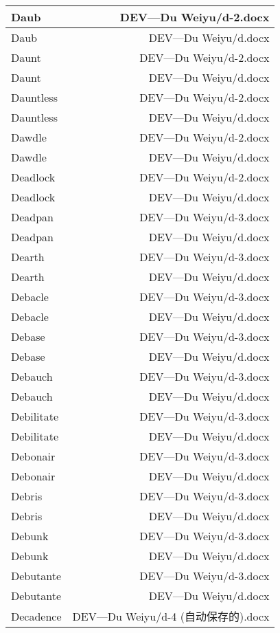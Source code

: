 \documentclass{article}
\begin{document}
\begin{center}
\begin{longtable}{|l|r|}
\hline
Daub  &  DEV---Du Weiyu/d-2.docx\\  
\hline
Daub  &  DEV---Du Weiyu/d.docx\\  
\hline
Daunt  &  DEV---Du Weiyu/d-2.docx\\  
\hline
Daunt  &  DEV---Du Weiyu/d.docx\\  
\hline
Dauntless  &  DEV---Du Weiyu/d-2.docx\\  
\hline
Dauntless  &  DEV---Du Weiyu/d.docx\\  
\hline
Dawdle  &  DEV---Du Weiyu/d-2.docx\\  
\hline
Dawdle  &  DEV---Du Weiyu/d.docx\\  
\hline
Deadlock  &  DEV---Du Weiyu/d-2.docx\\  
\hline
Deadlock  &  DEV---Du Weiyu/d.docx\\  
\hline
Deadpan  &  DEV---Du Weiyu/d-3.docx\\  
\hline
Deadpan  &  DEV---Du Weiyu/d.docx\\  
\hline
Dearth  &  DEV---Du Weiyu/d-3.docx\\  
\hline
Dearth  &  DEV---Du Weiyu/d.docx\\  
\hline
Debacle  &  DEV---Du Weiyu/d-3.docx\\  
\hline
Debacle  &  DEV---Du Weiyu/d.docx\\  
\hline
Debase  &  DEV---Du Weiyu/d-3.docx\\  
\hline
Debase  &  DEV---Du Weiyu/d.docx\\  
\hline
Debauch  &  DEV---Du Weiyu/d-3.docx\\  
\hline
Debauch  &  DEV---Du Weiyu/d.docx\\  
\hline
Debilitate  &  DEV---Du Weiyu/d-3.docx\\  
\hline
Debilitate  &  DEV---Du Weiyu/d.docx\\  
\hline
Debonair  &  DEV---Du Weiyu/d-3.docx\\  
\hline
Debonair  &  DEV---Du Weiyu/d.docx\\  
\hline
Debris  &  DEV---Du Weiyu/d-3.docx\\  
\hline
Debris  &  DEV---Du Weiyu/d.docx\\  
\hline
Debunk  &  DEV---Du Weiyu/d-3.docx\\  
\hline
Debunk  &  DEV---Du Weiyu/d.docx\\  
\hline
Debutante  &  DEV---Du Weiyu/d-3.docx\\  
\hline
Debutante  &  DEV---Du Weiyu/d.docx\\  
\hline
Decadence  &  DEV---Du Weiyu/d-4 (自动保存的).docx\\  

\end{longtable}
\end{center}
\end{document}
